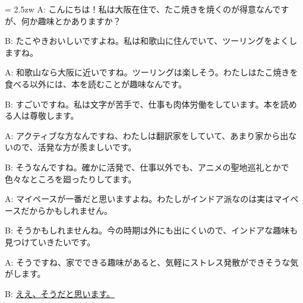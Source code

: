 \documentclass[11pt]{amsart}
\title{}
\author{}
\newenvironment{hangall}[1]{\hangindent = 2.5zw\everypar{\hangindent = 2.5zw}}{}
\begin{document}
\maketitle
\begin{hangall}{}%
A: こんにちは！私は大阪在住で、たこ焼きを焼くのが得意なんですが、何か趣味とかありますか？

B: たこやきおいしいですよね。私は和歌山に住んでいて、ツーリングをよくしますね。

A: 和歌山なら大阪に近いですね。ツーリングは楽しそう。わたしはたこ焼きを食べる以外には、本を読むことが趣味なんです。

B: すごいですね。私は文字が苦手で、仕事も肉体労働をしています。本を読める人は尊敬します。

A: アクティブな方なんですね、わたしは翻訳家をしていて、あまり家から出ないので、活発な方が羨ましいです。

B: そうなんですね。確かに活発で、仕事以外でも、アニメの聖地巡礼とかで色々なところを廻ったりしてます。

A: マイペースが一番だと思いますよね。わたしがインドア派なのは実はマイペースだからかもしれません。

B: そうかもしれませんね。今の時期は外にも出にくいので、インドアな趣味も見つけていきたいです。

A: そうですね、家でできる趣味があると、気軽にストレス発散ができそうな気がします。

B: \ul{ええ、そうだと思います。}\end{hangall}
\end{document}
